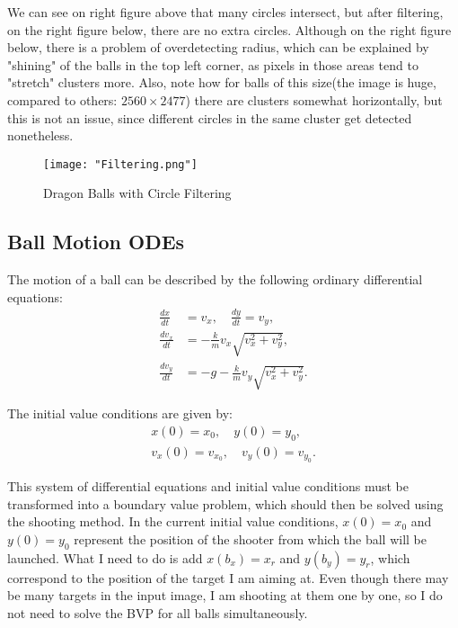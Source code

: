 \documentclass{article}
\begin{document}
	We can see on right figure above that many circles intersect, but after filtering, on the right figure below, there are no extra circles. Although on the right figure below, there is a problem of overdetecting radius, which can be explained by "shining" of the balls in the top left corner, as pixels in those areas tend to "stretch" clusters more. Also, note how for balls of this size(the image is huge, compared to others: $2560 \times 2477$) there are clusters somewhat horizontally, but this is not an issue, since different circles in the same cluster get detected nonetheless.
	
	\begin{figure}[H]
		\centering
		\texttt{[image: "Filtering.png"]}
		\caption{Dragon Balls with Circle Filtering}
	\end{figure} 
	
	\newpage
	\subsection*{Ball Motion ODEs}
	
	The motion of a ball can be described by the following ordinary differential equations:	
	\begin{align}
		\frac{dx}{dt} &= v_x, \quad \frac{dy}{dt} = v_y, \\
		\frac{dv_x}{dt} &= -\frac{k}{m} v_x \sqrt{v_x^2 + v_y^2}, \\
		\frac{dv_y}{dt} &= -g - \frac{k}{m} v_y \sqrt{v_x^2 + v_y^2}.
	\end{align}
	
	The initial value conditions are given by:
	\begin{align*}
		x(0) = x_0, \quad y(0) = y_0, \\
		v_x(0) = v_{x_0}, \quad v_y(0) = v_{y_0}.
	\end{align*}
	
	This system of differential equations and initial value conditions must be  transformed into a boundary value problem, which should then be solved using the shooting method. In the current initial value conditions, $x(0) = x_0$ and $y(0) = y_0$ represent the position of the shooter from which the ball will be launched. What I need to do is add $x(b_x) = x_r$ and $y(b_y) = y_r$, which correspond to the position of the target I am aiming at. Even though there may be many targets in the input image, I am shooting at them one by one, so I do not need to solve the BVP for all balls simultaneously.
	
\end{document}
